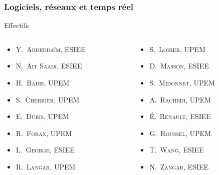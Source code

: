 \documentclass[]{beamer}
\begin{document}
\begin{frame}
  \frametitle{Logiciels, réseaux et temps réel}

  \begin{block}{Effectifs}
    \begin{columns}
      \begin{column}{0.5\textwidth}
        \begin{itemize}
          \item \textsc{Y.~Abdeddaïm}, ESIEE
          \item \textsc{N.~Ait Saadi}, ESIEE
          \item \textsc{H.~Badis}, UPEM
          \item \textsc{S.~Cherrier}, UPEM
          \item \textsc{E.~Duris}, UPEM
          \item \textsc{R.~Forax}, UPEM
          \item \textsc{L.~George}, ESIEE
          \item \alert{\textsc{R.~Langar}, UPEM}
        \end{itemize}
      \end{column}
      \begin{column}{0.5\textwidth}
        \begin{itemize}
          \item \textsc{S.~Lohier}, UPEM
          \item \textsc{D.~Masson}, ESIEE
          \item \textsc{S.~Midonnet}, UPEM
          \item \textsc{A.~Rachedi}, UPEM
          \item \textcolor{Nouveau}{\textsc{\'E.~Renault}, ESIEE}
          \item \textsc{G.~Roussel}, UPEM
          \item \textsc{T.~Wang}, ESIEE
          \item \textsc{N.~Zangar}, ESIEE
        \end{itemize}
      \end{column}
    \end{columns}
  \end{block}

\end{frame}

\end{document}
